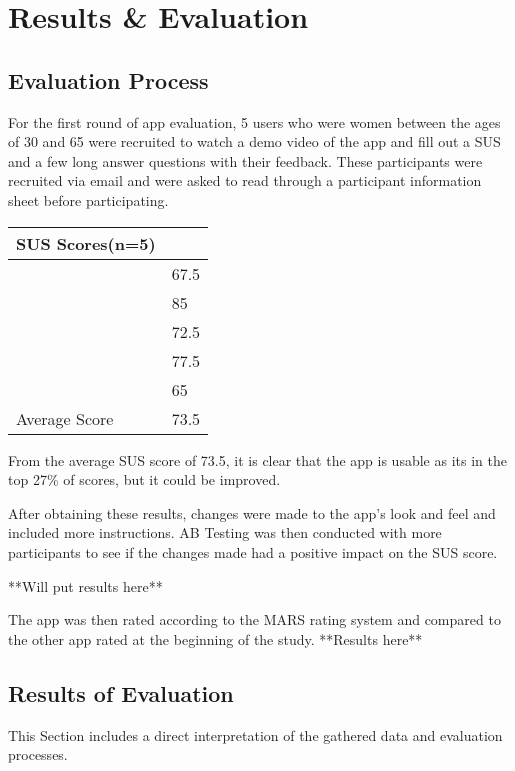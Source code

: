 \section{Results \& Evaluation}\label{results}


\subsection{Evaluation Process}
For the first round of app evaluation, 5 users who were women between the ages of 30 and 65 were recruited to watch a demo video of the app and fill out a SUS and a few long answer questions with their feedback. These participants were recruited via email and were asked to read through a participant information sheet before participating.

\begin{table}[h!!]
    \begin{tabular}{ll}
    \hline
    SUS Scores(n=5) &      \\ \hline
                    & 67.5 \\
                    & 85   \\
                    & 72.5 \\
                    & 77.5 \\
                    & 65   \\
        Average Score & 73.5
    \end{tabular}
    \end{table}

From the average SUS score of 73.5, it is clear that the app is usable as its in the top 27\% of scores, but it could be improved.

After obtaining these results, changes were made to the app's look and feel and included more instructions. AB Testing was then conducted with more participants to see if the changes made had a positive impact on the SUS score. 

**Will put results here** 

The app was then rated according to the MARS rating system and compared to the other app rated at the beginning of the study. **Results here** 

\subsection{Results of Evaluation}
This Section includes a direct interpretation of the gathered data and evaluation processes. 

